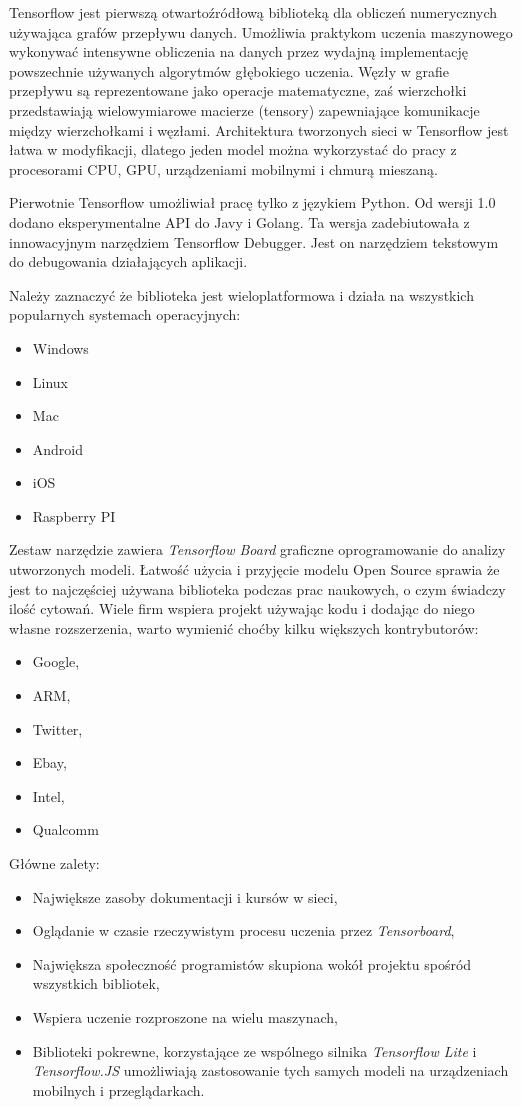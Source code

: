 \documentclass[12pt,a4paper,twoside,titlepage,openright]{book}
\begin{document}
Tensorflow jest pierwszą otwartoźródłową biblioteką dla obliczeń numerycznych używająca grafów przepływu danych. Umożliwia praktykom uczenia maszynowego wykonywać intensywne obliczenia na danych przez wydajną implementację powszechnie używanych algorytmów głębokiego uczenia. Węzły w grafie przepływu są reprezentowane jako operacje matematyczne, zaś wierzchołki przedstawiają wielowymiarowe macierze (tensory) zapewniające komunikacje między wierzchołkami i węzłami. Architektura tworzonych sieci w Tensorflow jest łatwa w modyfikacji, dlatego jeden model można wykorzystać do pracy z procesorami CPU, GPU, urządzeniami mobilnymi i chmurą mieszaną. \cite{DeepLearningTensorflow}

Pierwotnie Tensorflow umożliwiał pracę tylko z językiem Python. Od wersji 1.0 dodano eksperymentalne API do Javy i Golang. Ta wersja zadebiutowała z innowacyjnym narzędziem Tensorflow Debugger. Jest on narzędziem tekstowym do debugowania działających aplikacji.

Należy zaznaczyć że biblioteka jest wieloplatformowa i działa na wszystkich popularnych systemach operacyjnych:
\begin{itemize}
\item Windows
\item Linux
\item Mac
\item Android
\item iOS
\item Raspberry PI
\end{itemize}

Zestaw narzędzie zawiera \textit{Tensorflow Board} graficzne oprogramowanie do analizy utworzonych modeli. Łatwość użycia i przyjęcie modelu Open Source sprawia że jest to najczęściej używana biblioteka podczas prac naukowych, o czym świadczy ilość cytowań. \cite{siteTensorflowCitations} Wiele firm wspiera projekt używając kodu i dodając do niego własne rozszerzenia, warto wymienić choćby kilku większych kontrybutorów:
\begin{itemize}
\item Google,
\item ARM,
\item Twitter,
\item Ebay,
\item Intel,
\item Qualcomm
\end{itemize}

Główne zalety:
\begin{itemize}
\item Największe zasoby dokumentacji i kursów w sieci,
\item Oglądanie w czasie rzeczywistym procesu uczenia przez \textit{Tensorboard},
\item Największa społeczność programistów skupiona wokół projektu spośród wszystkich bibliotek,
\item Wspiera uczenie rozproszone na wielu maszynach,
\item Biblioteki pokrewne, korzystające ze wspólnego silnika \textit{Tensorflow Lite} i \textit{Tensorflow.JS} umożliwiają zastosowanie tych samych modeli na urządzeniach mobilnych i przeglądarkach.
\end{itemize}
\end{document}
